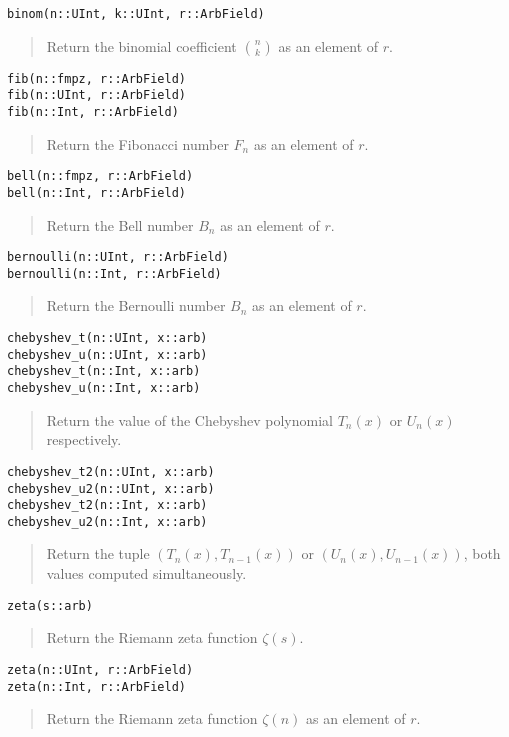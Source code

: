 \documentclass[a4paper,10pt]{article}
\newcommand{\desc}[1]{\vspace{-3mm}\begin{quote}#1\end{quote}}
\begin{document}
{{\begin{lstlisting}
binom(n::UInt, k::UInt, r::ArbField)
\end{lstlisting}

\desc{Return the binomial coefficient ${n \choose k}$ as an element of $r$.}

\begin{lstlisting}
fib(n::fmpz, r::ArbField)
fib(n::UInt, r::ArbField)
fib(n::Int, r::ArbField)
\end{lstlisting}

\desc{Return the Fibonacci number $F_n$ as an element of $r$.}

\begin{lstlisting}
bell(n::fmpz, r::ArbField)
bell(n::Int, r::ArbField)
\end{lstlisting}

\desc{Return the Bell number $B_n$ as an element of $r$.}

\begin{lstlisting}
bernoulli(n::UInt, r::ArbField)
bernoulli(n::Int, r::ArbField)
\end{lstlisting}

\desc{Return the Bernoulli number $B_n$ as an element of $r$.}

\begin{lstlisting}
chebyshev_t(n::UInt, x::arb)
chebyshev_u(n::UInt, x::arb)
chebyshev_t(n::Int, x::arb)
chebyshev_u(n::Int, x::arb)
\end{lstlisting}

\desc{Return the value of the Chebyshev polynomial $T_n(x)$ or $U_n(x)$ respectively.}

\begin{lstlisting}
chebyshev_t2(n::UInt, x::arb)
chebyshev_u2(n::UInt, x::arb)
chebyshev_t2(n::Int, x::arb)
chebyshev_u2(n::Int, x::arb)
\end{lstlisting}

\desc{Return the tuple $(T_{n}(x), T_{n-1}(x))$ or $(U_{n}(x), U_{n-1}(x))$,
both values computed simultaneously.}

\begin{lstlisting}
zeta(s::arb)
\end{lstlisting}

\desc{Return the Riemann zeta function $\zeta(s)$.}

\begin{lstlisting}
zeta(n::UInt, r::ArbField)
zeta(n::Int, r::ArbField)
\end{lstlisting}

\desc{Return the Riemann zeta function $\zeta(n)$ as an element of $r$.}

}}
\end{document}
